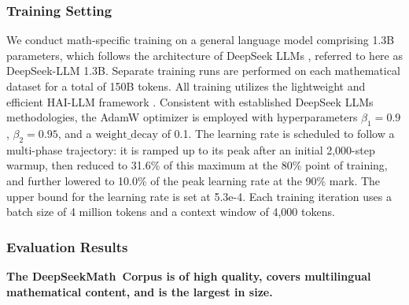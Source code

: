 \subsubsection{Training Setting}
\label{sec:quality-policy}
We conduct math-specific training on a general language model comprising 1.3B parameters, which follows the architecture of DeepSeek LLMs \citep{deepseek-llm}, referred to here as DeepSeek-LLM 1.3B. Separate training runs are performed on each mathematical dataset for a total of 150B tokens. All training utilizes the lightweight and efficient HAI-LLM framework \citep{haillm}. Consistent with established DeepSeek LLMs methodologies, the AdamW optimizer \citep{adamW} is employed with hyperparameters $\beta_1=0.9$, $\beta_2=0.95$, and a $\mathrm{weight\_decay}$ of 0.1. The learning rate is scheduled to follow a multi-phase trajectory: it is ramped up to its peak after an initial 2,000-step warmup, then reduced to 31.6\% of this maximum at the 80\% point of training, and further lowered to 10.0\% of the peak learning rate at the 90\% mark. The upper bound for the learning rate is set at 5.3e-4. Each training iteration uses a batch size of 4 million tokens and a context window of 4,000 tokens.

\subsubsection{Evaluation Results}

\textbf{The DeepSeekMath~Corpus is of high quality, covers multilingual mathematical content, and is the largest in size.}

